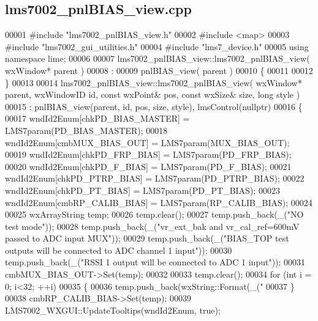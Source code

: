 \subsection{lms7002\+\_\+pnl\+B\+I\+A\+S\+\_\+view.\+cpp}
\label{lms7002__pnlBIAS__view_8cpp_source}

\begin{DoxyCode}
00001 \textcolor{preprocessor}{#include "lms7002_pnlBIAS_view.h"}
00002 \textcolor{preprocessor}{#include <map>}
00003 \textcolor{preprocessor}{#include "lms7002_gui_utilities.h"}
00004 \textcolor{preprocessor}{#include "lms7_device.h"}
00005 \textcolor{keyword}{using namespace }lime;
00006 
00007 lms7002_pnlBIAS_view::lms7002_pnlBIAS_view( wxWindow* parent )
00008 :
00009 pnlBIAS_view( parent )
00010 \{
00011 
00012 \}
00013 
00014 lms7002_pnlBIAS_view::lms7002_pnlBIAS_view( wxWindow* parent, wxWindowID \textcolor{keywordtype}{id}, \textcolor{keyword}{const} wxPoint& pos, \textcolor{keyword}{const} 
      wxSize& size, \textcolor{keywordtype}{long} style )
00015     : pnlBIAS_view(parent, id, pos, size, style), lmsControl(nullptr)
00016 \{
00017     wndId2Enum[chkPD_BIAS_MASTER] = LMS7param(PD_BIAS_MASTER);
00018     wndId2Enum[cmbMUX_BIAS_OUT] = LMS7param(MUX_BIAS_OUT);
00019     wndId2Enum[chkPD_FRP_BIAS] = LMS7param(PD_FRP_BIAS);
00020     wndId2Enum[chkPD_F_BIAS] = LMS7param(PD_F_BIAS);
00021     wndId2Enum[chkPD_PTRP_BIAS] = LMS7param(PD_PTRP_BIAS);
00022     wndId2Enum[chkPD_PT_BIAS] = LMS7param(PD_PT_BIAS);
00023     wndId2Enum[cmbRP_CALIB_BIAS] = LMS7param(RP_CALIB_BIAS);
00024 
00025     wxArrayString temp;
00026     temp.clear();
00027     temp.push\_back(\_(\textcolor{stringliteral}{"NO test mode"}));
00028     temp.push\_back(\_(\textcolor{stringliteral}{"vr\_ext\_bak and vr\_cal\_ref=600mV passed to ADC input MUX"}));
00029     temp.push\_back(\_(\textcolor{stringliteral}{"BIAS\_TOP test outputs will be connected to ADC channel 1 input"}));
00030     temp.push\_back(\_(\textcolor{stringliteral}{"RSSI 1 output will be connected to ADC 1 input"}));
00031     cmbMUX_BIAS_OUT->Set(temp);
00032 
00033     temp.clear();
00034     \textcolor{keywordflow}{for} (\textcolor{keywordtype}{int} i = 0; i<32; ++i)
00035     \{
00036         temp.push\_back(wxString::Format(\_(\textcolor{stringliteral}{"%
00037     \}
00038     cmbRP_CALIB_BIAS->Set(temp);
00039     LMS7002_WXGUI::UpdateTooltips(wndId2Enum, \textcolor{keyword}{true});
}
\end{DoxyCode}
